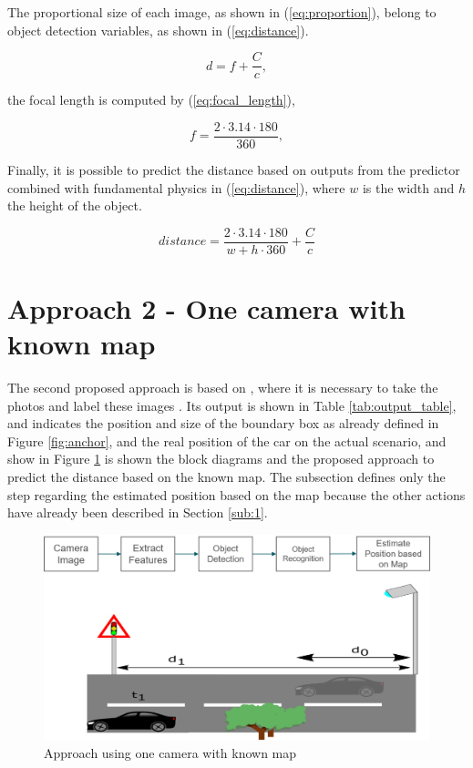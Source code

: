 The proportional size of each image, as shown in (\ref{eq:proportion}), belong to object detection variables, as shown in (\ref{eq:distance}).


\begin{equation}
    \label{eq:proportion}
    d = f + \frac{C}{c},
\end{equation}

the focal length is computed by (\ref{eq:focal_length}), 

\begin{equation}
    \label{eq:focal_length}
    f = \frac{2\cdot 3.14 \cdot 180}{360},
\end{equation}

Finally, it is possible to predict the distance based on outputs from the predictor combined with fundamental physics in (\ref{eq:distance}), where $w$ is the width and $h$ the height of the object.

\begin{equation}
    \label{eq:distance}
    distance = \frac{2 \cdot 3.14 \cdot  180}{w + h \cdot  360} + \frac{C}{c}
\end{equation}



 
\section{Approach 2 - One camera with known map}\label{sub:2}

The second proposed approach is based on  \cite{mayer2016large}, where it is necessary to take the photos and label these images \cite{tzutalin6labelimg}. Its output is shown in Table \ref{tab:output_table}, and indicates the position and size of the boundary box as already defined in Figure \ref{fig:anchor}, and the real position of the car on the actual scenario, and show in Figure \ref{fig:proposal2} is shown the block diagrams and the proposed approach to predict the distance based on the known map. The subsection defines only the step regarding the estimated position based on the map because the other actions have already been described in Section \ref{sub:1}. 


\begin{figure}[H]
\centering
\includegraphics[width=\textwidth]{imagens/proposal2.png}
\caption{Approach using one camera with known map}
\label{fig:proposal2}
\end{figure}


